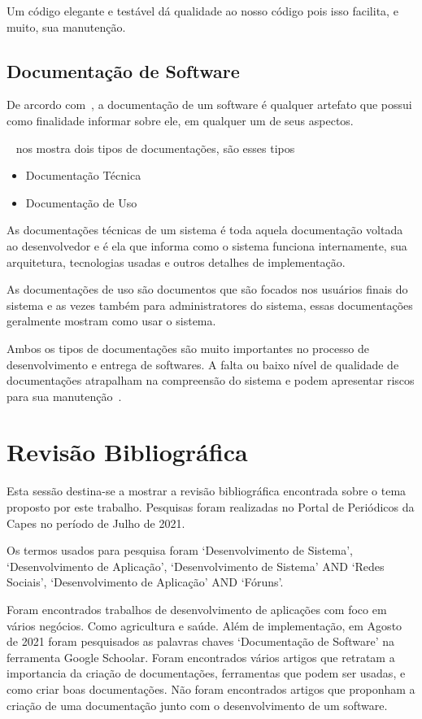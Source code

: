 \documentclass[12pt]{article}
\begin{document}
Um código elegante e testável dá qualidade ao nosso código pois isso facilita, e muito, sua manutenção.

\subsection{Documentação de Software}

De arcordo com~\cite{Forward02softwaredocumentation}, a documentação de um software é qualquer
artefato que possui como finalidade informar sobre ele, em qualquer um de seus aspectos.

~\cite{Coelho_2009} nos mostra dois tipos de documentações, são esses tipos

\begin{itemize}
	\item Documentação Técnica
	\item Documentação de Uso
\end{itemize}

As documentações técnicas de um sistema é toda aquela documentação voltada ao desenvolvedor e é
ela que informa como o sistema funciona internamente, sua arquitetura, tecnologias usadas e outros detalhes de implementação.

As documentações de uso são documentos que são focados nos usuários finais do sistema e as vezes também para administratores do sistema,
essas documentações geralmente mostram como usar o sistema.

Ambos os tipos de documentações são muito importantes no processo de desenvolvimento e entrega de softwares. A falta ou
baixo nível de qualidade de documentações atrapalham na compreensão do sistema e podem apresentar
riscos para sua manutenção~\cite{deinvestigaccao}.

\section{Revisão Bibliográfica}

Esta sessão destina-se a mostrar a revisão bibliográfica encontrada sobre o tema proposto por este trabalho.
Pesquisas foram realizadas no Portal de Periódicos da Capes no período de Julho de 2021.

Os termos usados para pesquisa foram `Desenvolvimento de Sistema', `Desenvolvimento de Aplicação', 
`Desenvolvimento de Sistema' AND `Redes Sociais', `Desenvolvimento de Aplicação' AND `Fóruns'.

Foram encontrados trabalhos de desenvolvimento de aplicações com foco em vários negócios. Como agricultura e
saúde. Além de implementação, em Agosto de 2021 foram pesquisados as palavras chaves `Documentação de Software' na ferramenta
Google Schoolar. Foram encontrados vários artigos que retratam a importancia da criação de documentações,
ferramentas que podem ser usadas, e como criar boas documentações. Não foram encontrados artigos que proponham
a criação de uma documentação junto com o desenvolvimento de um software.
\end{document}
